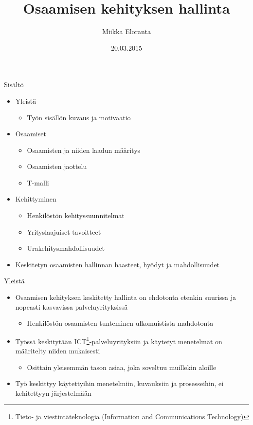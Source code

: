 \documentclass[first=purple,second=dblue,logo=redquo]{aaltoslides}
\title{Osaamisen kehityksen hallinta}
\author[M. Eloranta]{Miikka Eloranta}
\institute[AS]{Automaatio- ja systeemitekniikka\\
Sähkötekniikan korkeakoulu, Aalto-yliopisto}
\date{20.03.2015}
\begin{document}
\aaltotitleframe

\begin{frame}{Sisältö}
\begin{itemize}
\item Yleistä
\begin{itemize}
\item Työn sisällön kuvaus ja motivaatio
\end{itemize}
\item Osaamiset
\begin{itemize}
\item Osaamisten ja niiden laadun määritys
\item Osaamisten jaottelu
\item T-malli
\end{itemize}
\item Kehittyminen
\begin{itemize}
\item Henkilöstön kehityssuunnitelmat
\item Yrityslaajuiset tavoitteet
\item Urakehitysmahdollisuudet
\end{itemize}
\item Keskitetyn osaamisten hallinnan haasteet, hyödyt ja mahdollisuudet
\end{itemize}
\end{frame}

\begin{frame}{Yleistä}
\begin{itemize}
\item Osaamisen kehityksen keskitetty hallinta on ehdotonta etenkin suurissa ja nopeasti kasvavissa palveluyrityksissä
\begin{itemize}
\item Henkilöstön osaamisten tunteminen ulkomuistista mahdotonta
\end{itemize}
\item Työssä keskitytään ICT\footnote{\tiny{Tieto- ja viestintäteknologia (Information and Communications Technology)}}-palveluyrityksiin ja käytetyt menetelmät on määritelty niiden mukaisesti
\begin{itemize}
\item Osittain yleisemmän tason asiaa, joka soveltuu muillekin aloille
\end{itemize}
\item Työ keskittyy käytettyihin menetelmiin, kuvauksiin ja prosesseihin, ei kehitettyyn järjestelmään
\end{itemize}
\end{frame}
\end{document}
